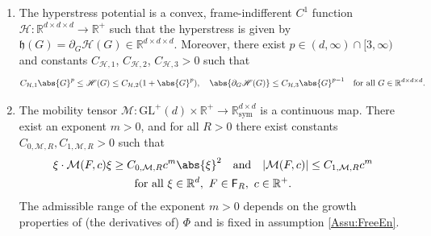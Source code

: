 \documentclass[a4paper,12pt]{article}
\newcommand{\R}{\mathbb{R}}
\newcommand{\calM}{\mathcal{M}}
\newcommand{\pl}{\partial}
\newcommand{\calH}{\mathcal{H}}
\newcommand{\mfh}{\mathfrak{h}}
\newcommand{\GL}{\mathrm{GL}}
\theoremstyle{plain}
\theoremstyle{definition}
\numberwithin{equation}{section}
\begin{document}
\begin{enumerate}[label=\emph{\bfseries (A\arabic*)}]
\item \label{Assu:Hyperstress} The hyperstress potential is a convex, frame-indifferent $C^1$ 
function $\mathscr{H}:\R^{d\times d\times d}\to \R^+$ such 
that the hyperstress is given by $\mfh(G) = \partial_G \mathscr{H}(G)\in\R^{d\times d\times d}$. Moreover, %
there exist $p\in (d,\infty)\cap [3,\infty)$ and constants $C_{\calH,1}$, $C_{\calH,2}$, $C_{\calH,3}>0$ such that 
\[
C_{\calH,1}\abs{G}^p\leq \mathscr{H}(G)\leq C_{\calH,2}(1+\abs{G}^p), \quad\abs{\pl_G\mathscr{H}(G)}\leq C_{\calH,3}\abs{G}^{p-1}\quad \text{for all}\  G\in \R^{d\times d\times d}.
\]



\item \label{Assu:MobilityTensor} 
The mobility tensor $\calM:\GL^+(d)\times \R^+
\to\R^{d\times d}_{\text{sym}}$ is a continuous map.
%
%
%
%
%
There exist an exponent $m>0$, and for all $R>0$ there exist constants $C_{0,\calM,R},C_{1,\calM,R}>0$ such that
\begin{equation}
	\begin{gathered}
\xi\cdot \calM(F,c)\xi\geq C_{0,\calM,R} c^{m}\abs{\xi}^2 
\quad\text{and}\quad 		|\calM(F,c)|\leq C_{1,\calM,R} c^{m}\\
\text{for all}\ \xi\in\R^d, ~F\in \mathsf{F}_R, ~c\in \R^+.
	\end{gathered}
\end{equation}
The admissible range of the exponent $m>0$ depends on the 
growth properties of (the derivatives of) $\Phi$ and is fixed in assumption 
\ref{Assu:FreeEn}.



\end{enumerate}
\end{document}
